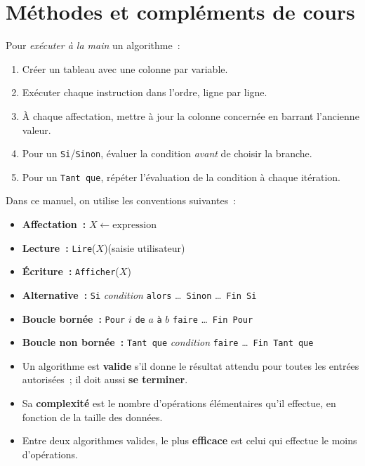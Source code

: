 \section{M\'ethodes et compl\'ements de cours}

\begin{methode}
Pour \emph{ex\'ecuter \`a la main} un algorithme~:
\begin{enumerate}
  \item Cr\'eer un tableau avec une colonne par variable.
  \item Ex\'ecuter chaque instruction dans l'ordre, ligne par ligne.
  \item \`A chaque affectation, mettre \`a jour la colonne concern\'ee
        en barrant l'ancienne valeur.
  \item Pour un \texttt{Si}/\texttt{Sinon}, \'evaluer la condition
        \emph{avant} de choisir la branche.
  \item Pour un \texttt{Tant que}, r\'ep\'eter l'\'evaluation de la
        condition \`a chaque it\'eration.
\end{enumerate}
\end{methode}

\begin{methode}
Dans ce manuel, on utilise les conventions suivantes~:
\begin{itemize}
  \item \textbf{Affectation~:} $X \leftarrow \text{expression}$
  \item \textbf{Lecture~:} \texttt{Lire}($X$)\quad (saisie utilisateur)
  \item \textbf{\'Ecriture~:} \texttt{Afficher}($X$)
  \item \textbf{Alternative~:}
        \texttt{Si} \emph{condition} \texttt{alors} \ldots\
        \texttt{Sinon} \ldots\ \texttt{Fin Si}
  \item \textbf{Boucle born\'ee~:}
        \texttt{Pour} $i$ \texttt{de} $a$ \texttt{\`a} $b$ \texttt{faire}
        \ldots\ \texttt{Fin Pour}
  \item \textbf{Boucle non born\'ee~:}
        \texttt{Tant que} \emph{condition} \texttt{faire}
        \ldots\ \texttt{Fin Tant que}
\end{itemize}
\end{methode}

\begin{defn}
\begin{itemize}
  \item Un algorithme est \textbf{valide} s'il donne le résultat attendu pour
        toutes les entrées autorisées~; il doit aussi \textbf{se terminer}.
  \item Sa \textbf{complexité} est le nombre d'opérations élémentaires qu'il
        effectue, en fonction de la taille des données.
  \item Entre deux algorithmes valides, le plus \textbf{efficace} est celui
        qui effectue le moins d'opérations.
\end{itemize}
\end{defn}

